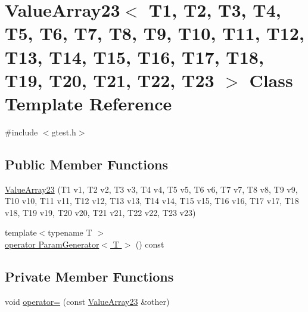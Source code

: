 \hypertarget{classtesting_1_1internal_1_1ValueArray23}{\section{\-Value\-Array23$<$ \-T1, \-T2, \-T3, \-T4, \-T5, \-T6, \-T7, \-T8, \-T9, \-T10, \-T11, \-T12, \-T13, \-T14, \-T15, \-T16, \-T17, \-T18, \-T19, \-T20, \-T21, \-T22, \-T23 $>$ \-Class \-Template \-Reference}
\label{dd/d4d/classtesting_1_1internal_1_1ValueArray23}
}


{\ttfamily \#include $<$gtest.\-h$>$}

\subsection*{\-Public \-Member \-Functions}
\begin{DoxyCompactItemize}
\item 
\hyperlink{classtesting_1_1internal_1_1ValueArray23_a0308b5df09f1b1ab48be22a2d24c3e6e}{\-Value\-Array23} (\-T1 v1, \-T2 v2, \-T3 v3, \-T4 v4, \-T5 v5, \-T6 v6, \-T7 v7, \-T8 v8, \-T9 v9, \-T10 v10, \-T11 v11, \-T12 v12, \-T13 v13, \-T14 v14, \-T15 v15, \-T16 v16, \-T17 v17, \-T18 v18, \-T19 v19, \-T20 v20, \-T21 v21, \-T22 v22, \-T23 v23)
\item 
{\footnotesize template$<$typename T $>$ }\\\hyperlink{classtesting_1_1internal_1_1ValueArray23_a08ef46fa12c9dd8ef6fc630baeea89b7}{operator Param\-Generator$<$ T $>$} () const 
\end{DoxyCompactItemize}
\subsection*{\-Private \-Member \-Functions}
\begin{DoxyCompactItemize}
\item 
void \hyperlink{classtesting_1_1internal_1_1ValueArray23_afd8adfdb7b3ed1395699dbddcbfc3cfc}{operator=} (const \hyperlink{classtesting_1_1internal_1_1ValueArray23}{\-Value\-Array23} \&other)
\end{DoxyCompactItemize}
